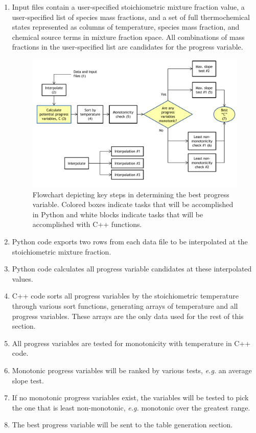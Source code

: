 \documentclass[11pt]{article}
\begin{document}
\begin{enumerate} 
\item Input files contain a user-specified stoichiometric mixture
  fraction value, a user-specified list of species mass fractions, and
  a set of full thermochemical states represented as columns of
  temperature, species mass fraction, and chemical source terms in
  mixture fraction space. All combinations of mass fractions in the
  user-specified list are candidates for the progress variable.

\begin{figure}[h]
  \centering
  \includegraphics[width=\textwidth]{diagram_1_v4.pdf}
  \caption{\label{fig:flow1}Flowchart depicting key steps in
    determining the best progress variable. Colored boxes indicate
    tasks that will be accomplished in Python and white blocks
    indicate tasks that will be accomplished with C++ functions.}
\end{figure}

\item Python code exports two rows from each data file to be
  interpolated at the stoichiometric mixture fraction.
\item Python code calculates all progress variable candidates at these
  interpolated values.
\item C++ code sorts all progress variables by the stoichiometric
  temperature through various sort functions, generating arrays of
  temperature and all progress variables. These arrays are the only
  data used for the rest of this section.
\item All progress variables are tested for monotonicity with
  temperature in C++ code.
\item Monotonic progress variables will be ranked by various tests,
  \textit{e.g.} an average slope test.
\item If no monotonic progress variables exist, the variables will be
  tested to pick the one that is least non-monotonic, \textit{e.g.}
  monotonic over the greatest range.
\item The best progress variable will be sent to the table generation
  section.
\end{enumerate}
\end{document}
